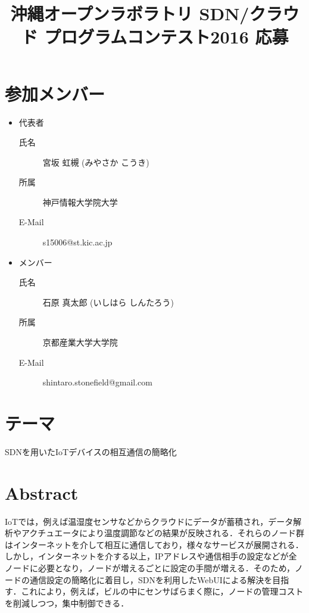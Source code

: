 \documentclass{jsarticle}
\begin{document}
\title{沖縄オープンラボラトリ SDN/クラウド プログラムコンテスト2016 応募}
\maketitle

\section{参加メンバー}
\begin{itemize}
	\item 代表者
		\begin{description}
			\item[氏名] 宮坂 虹槻 (みやさか こうき)
			\item[所属] 神戸情報大学院大学
			\item[E-Mail] s15006@st.kic.ac.jp
		\end{description}
	\item メンバー
		\begin{description}
			\item[氏名] 石原 真太郎 (いしはら しんたろう)
			\item[所属] 京都産業大学大学院
			\item[E-Mail] shintaro.stonefield@gmail.com
		\end{description}
\end{itemize}

\section{テーマ}
	SDNを用いたIoTデバイスの相互通信の簡略化




\section{Abstract}
IoTでは，例えば温湿度センサなどからクラウドにデータが蓄積され，データ解析やアクチュエータにより温度調節などの結果が反映される．それらのノード群はインターネットを介して相互に通信しており，様々なサービスが展開される．しかし，インターネットを介する以上，IPアドレスや通信相手の設定などが全ノードに必要となり，ノードが増えるごとに設定の手間が増える．そのため，ノードの通信設定の簡略化に着目し，SDNを利用したWebUIによる解決を目指す．これにより，例えば，ビルの中にセンサばらまく際に，ノードの管理コストを削減しつつ，集中制御できる．
\end{document}
